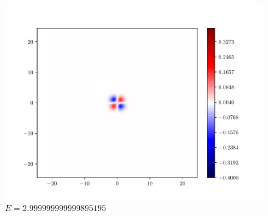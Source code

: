 \documentclass{article}
\begin{document}
\begin{enumerate}[1.]
\begin{enumerate}[(A)]
\begin{enumerate}[(i)]
\begin{figure}[H]
\begin{minipage}{0.3\linewidth}
          \includegraphics[width=\linewidth]{functions-5.pdf}
          \caption*{$E = 2.999999999999895195$}
        \end{minipage}


\end{figure}
\end{enumerate}
\end{enumerate}
\end{enumerate}
\end{document}
